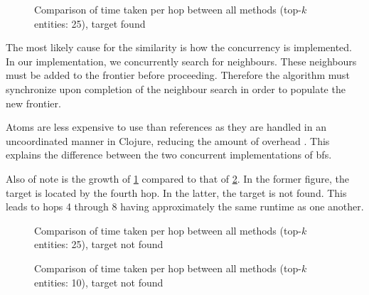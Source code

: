 				\begin{figure}[H]
					\centering
					
					
					\caption{Comparison of time taken per hop between all methods (top-\(k\) entities:  25), target found}
					\label{fig:method-runtime-tkes-25-stopsat4}
				\end{figure}
				
				The most likely cause for the similarity is how the concurrency is implemented.  In our implementation, we concurrently search for neighbours.  These neighbours must be added to the frontier before proceeding.  Therefore the algorithm must synchronize upon completion of the neighbour search in order to populate the new frontier.
				
				Atoms are less expensive to use than references as they are handled in an uncoordinated manner in Clojure, reducing the amount of overhead \cite{narkis-12}.  This explains the difference between the two concurrent implementations of \gls{bfs}.
				
				
				Also of note is the growth of \cref{fig:method-runtime-tkes-25-stopsat4} compared to that of \cref{fig:method-runtime-tkes-25}.  In the former figure, the target is located by the fourth hop.  In the latter, the target is not found.  This leads to hops 4 through 8 having approximately the same runtime as one another.
				
				\begin{figure}[H]
					\centering
					
					
					\caption{Comparison of time taken per hop between all methods (top-\(k\) entities:  25), target not found}
					\label{fig:method-runtime-tkes-25}
				\end{figure}
				
				\begin{figure}[H]
					\centering
					
					
					\caption{Comparison of time taken per hop between all methods (top-\(k\) entities:  10), target not found}
					\label{fig:method-runtime-tkes-10}
				\end{figure}